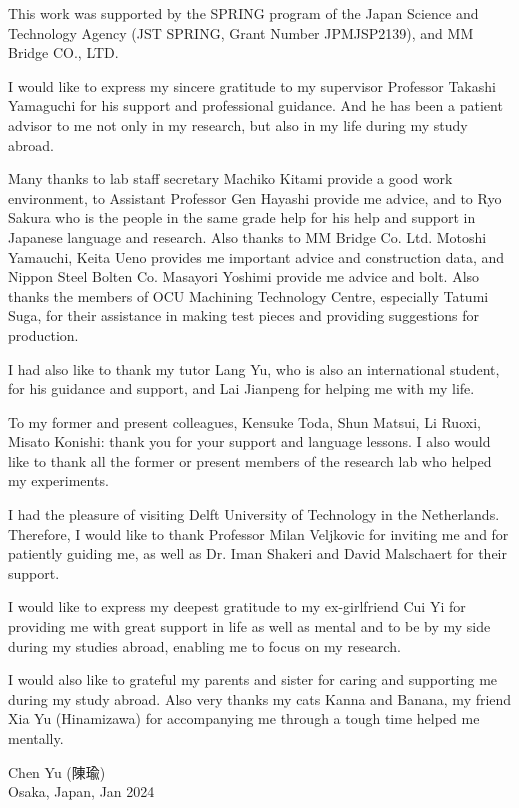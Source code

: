 
%
This work was supported by the SPRING program of the Japan Science and Technology Agency (JST SPRING, Grant Number JPMJSP2139), and MM Bridge CO., LTD.

I would like to express my sincere gratitude to my supervisor Professor Takashi Yamaguchi for his support and professional guidance. And he has been a patient advisor to me not only in my research, but also in my life during my study abroad.

Many thanks to lab staff secretary Machiko Kitami provide a good work environment, to Assistant Professor Gen Hayashi provide me advice, and to Ryo Sakura who is the people in the same grade help for his help and support in Japanese language and research. Also thanks to MM Bridge Co. Ltd. Motoshi Yamauchi, Keita Ueno provides me important advice and construction data, and Nippon Steel Bolten Co. Masayori Yoshimi provide me advice and bolt. Also thanks the members of OCU Machining Technology Centre, especially Tatumi Suga, for their assistance in making test pieces and providing suggestions for production.

I had also like to thank my tutor Lang Yu, who is also an international student, for his guidance and support, and Lai Jianpeng for helping me with my life.

To my former and present colleagues, Kensuke Toda, Shun Matsui, Li Ruoxi, Misato Konishi: thank you for your support and language lessons. I also would like to thank all the former or present members of the research lab who helped my experiments.

I had the pleasure of visiting Delft University of Technology in the Netherlands. Therefore, I would like to thank Professor Milan Veljkovic for inviting me and for patiently guiding me, as well as Dr. Iman Shakeri and David Malschaert for their support.

I would like to express my deepest gratitude to my ex-girlfriend Cui Yi for providing me with great support in life as well as mental and to be by my side during my studies abroad, enabling me to focus on my research.

I would also like to grateful my parents and sister for caring and supporting me during my study abroad. Also very thanks my cats Kanna and Banana, my friend Xia Yu (Hinamizawa) for accompanying me through a tough time helped me mentally.

\null\hfill Chen Yu (陳瑜) \\
\null\hfill Osaka, Japan, Jan 2024